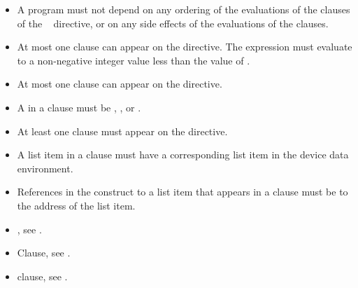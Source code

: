 \restrictions
\begin{itemize}
  \item A program must not depend on any ordering of the evaluations of the clauses of the
    ~ directive, or on any side effects of the evaluations of the clauses.

  \item At most one  clause can appear on the directive. The  expression
    must evaluate to a non-negative integer value less than the value
    of .

  \item At most one  clause can appear on the directive.
  \item A  in a  clause must be , ,  or .
  \item At least one  clause must appear on the directive.


  \item A list item in a  clause must have a
    corresponding list item in the device data environment.

  \item References in the construct to a list item that appears in a
     clause must be to the address of the list item.
\end{itemize}

\crossreferences
\begin{itemize}
\item {}, see 
. 

\item {} Clause, see .

\item {} clause, see 
.
\end{itemize}










